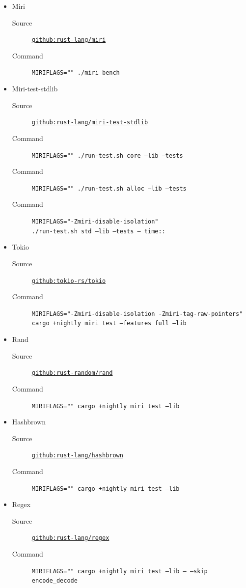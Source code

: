 \documentclass[a4paper,11pt]{article}
\theoremstyle{plain}
\theoremstyle{definition}
\theoremstyle{remark}
\begin{document}
\begin{itemize}
    \item Miri
        \begin{description}
            \item[Source] \href{https://github.com/rust-lang/miri}{\texttt{github:rust-lang/miri}}
            \item[Command] \texttt{MIRIFLAGS="" ./miri bench}
        \end{description}
    \item Miri-test-stdlib
        \begin{description}
            \item[Source] \href{https://github.com/rust-lang/miri-test-stdlib}{\texttt{github:rust-lang/miri-test-stdlib}}
            \item[Command] \texttt{MIRIFLAGS="" ./run-test.sh core --lib --tests}
            \item[Command] \texttt{MIRIFLAGS="" ./run-test.sh alloc --lib --tests}
            \item[Command] \texttt{MIRIFLAGS="-Zmiri-disable-isolation"}\\
                \texttt{./run-test.sh std --lib --tests -- time::}
        \end{description}
    \item Tokio
        \begin{description}
            \item[Source] \href{https://github.com/tokio-rs/tokio}{\texttt{github:tokio-rs/tokio}}
            \item[Command] \texttt{MIRIFLAGS="-Zmiri-disable-isolation -Zmiri-tag-raw-pointers"} \\
                \texttt{cargo +nightly miri test --features full --lib}
        \end{description}
    \item Rand
        \begin{description}
            \item[Source] \href{https://github.com/rust-random/rand}{\texttt{github:rust-random/rand}}
            \item[Command] \texttt{MIRIFLAGS="" cargo +nightly miri test --lib}
        \end{description}
    \item Hashbrown
        \begin{description}
            \item[Source] \href{https://github.com/rust-lang/hashbrown}{\texttt{github:rust-lang/hashbrown}}
            \item[Command] \texttt{MIRIFLAGS="" cargo +nightly miri test --lib}
        \end{description}
    \item Regex
        \begin{description}
            \item[Source] \href{https://github.com/rust-lang/regex}{\texttt{github:rust-lang/regex}}
            \item[Command] \texttt{MIRIFLAGS="" cargo +nightly miri test --lib -- --skip encode\_decode}
        \end{description}



\end{itemize}
\end{document}
